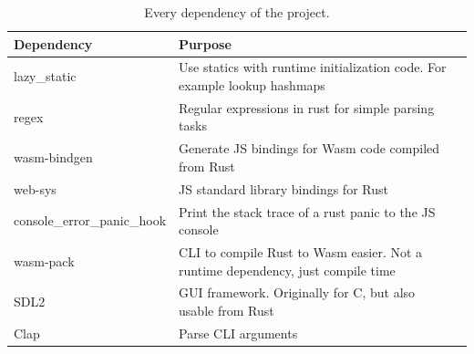 \begin{table}[h]
  \begin{center}
    \centering
    \begin{tabularx}{\textwidth}{|l|X|X|}
      \toprule
      Dependency        & Purpose              \\ \midrule
      lazy\_static      & Use statics with runtime initialization code. For example lookup hashmaps \\ \midrule
      regex      & Regular expressions in rust for simple parsing tasks \\ \midrule
      wasm-bindgen      & Generate JS bindings for Wasm code compiled from Rust \\ \midrule
      web-sys      & JS standard library bindings for Rust \\ \midrule
      console\_error\_panic\_hook      & Print the stack trace of a rust panic to the JS console \\ \midrule
      wasm-pack      & CLI to compile Rust to Wasm easier. Not a runtime dependency, just compile time \\ \midrule
      SDL2      & GUI framework. Originally for C, but also usable from Rust \\ \midrule
      Clap      & Parse CLI arguments \\
      \bottomrule
    \end{tabularx}
    \caption{Every dependency of the project.}
    \label{table:dependencies}
  \end{center}
\end{table}

